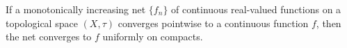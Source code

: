 \documentclass[12pt]{article}
\begin{document}
If a monotonically increasing net $\{ f_n\}$ of continuous real-valued functions on a topological space $(X,\tau)$ converges pointwise to a continuous function $f$, then the net converges to $f$ uniformly on compacts.
\end{document}
